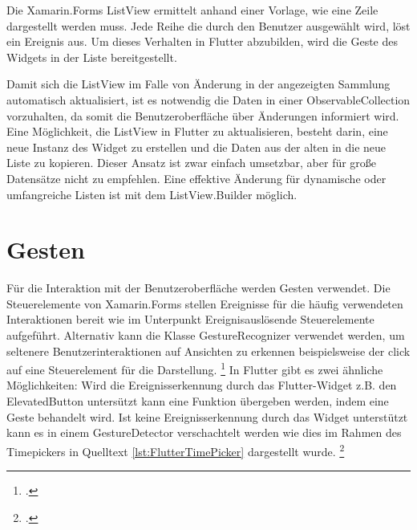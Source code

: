 Die Xamarin.Forms \glq ListView \grq{}ermittelt anhand einer Vorlage,  wie eine Zeile dargestellt werden muss.  Jede Reihe die durch den Benutzer ausgewählt wird,  löst ein Ereignis aus.  Um dieses Verhalten in Flutter abzubilden,  wird die Geste des Widgets in der Liste bereitgestellt.  

Damit sich die ListView im Falle von Änderung in der angezeigten Sammlung automatisch aktualisiert, ist es notwendig die Daten in einer \glq ObservableCollection\grq{} vorzuhalten,  da somit die Benutzeroberfläche über Änderungen informiert wird.   Eine  Möglichkeit, die  \glq ListView\grq{} in Flutter zu aktualisieren, besteht darin, eine neue Instanz des Widget zu erstellen und die Daten aus der alten in die neue Liste zu kopieren.  Dieser Ansatz ist zwar einfach umsetzbar, aber für große Datensätze nicht zu empfehlen.  Eine effektive Änderung für dynamische oder umfangreiche Listen ist mit dem ListView.Builder möglich.   

\section{Gesten}
Für die Interaktion mit der Benutzeroberfläche werden Gesten verwendet.  Die Steuerelemente von Xamarin.Forms stellen Ereignisse für die häufig verwendeten Interaktionen bereit wie im Unterpunkt Ereignisauslösende Steuerelemente aufgeführt.  Alternativ kann die Klasse  \glq GestureRecognizer\grq{}  verwendet werden, um seltenere Benutzerinteraktionen auf Ansichten zu erkennen beispielsweise der click auf eine Steuerelement für die Darstellung.  \footcite[Vgl.][Abgerufen am \today]{MicrosoftGesten2020} 
In Flutter gibt es zwei ähnliche Möglichkeiten: Wird die Ereignisserkennung durch das Flutter-Widget z.B. den \glq ElevatedButton\grq{} untersützt kann eine Funktion übergeben werden, indem eine Geste behandelt wird.  Ist keine Ereignisserkennung durch das Widget unterstützt kann es in einem \glq GestureDetector\grq{} verschachtelt werden wie dies im Rahmen des  \glq Timepickers\grq{} in Quelltext \ref{lst:FlutterTimePicker} dargestellt wurde. \footcite[Vgl.][Abgerufen am \today]{GoogleGesture2020} 


